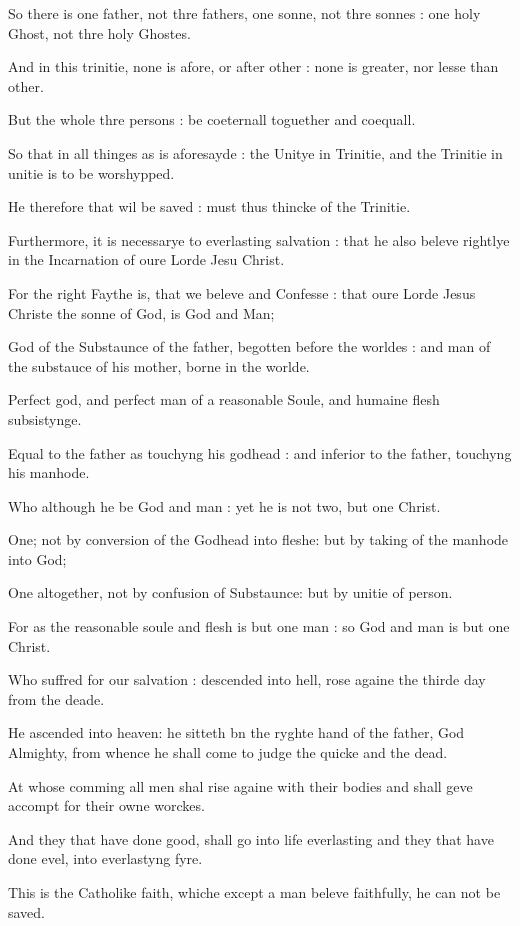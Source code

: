 So there is one father, not thre fathers, one sonne,
not thre sonnes : one holy Ghost, not thre holy Ghostes.

And in this trinitie, none is afore, or after other
: none is greater, nor lesse than other.

But the whole thre persons : be coeternall toguether
and coequall.

So that in all thinges as is aforesayde : the Unitye
in Trinitie, and the Trinitie in unitie is to be worshypped.

He therefore that wil be saved : must thus thincke
of the Trinitie.

Furthermore, it is necessarye to everlasting salvation
: that he also beleve rightlye in the Incarnation of oure Lorde Jesu Christ.

For the right Faythe is, that we beleve and Confesse
: that oure Lorde Jesus Christe the sonne of God, is God and Man;

God of the Substaunce of the father, begotten before
the worldes : and man of the substauce of his mother, borne in the worlde.

Perfect god, and perfect man of a reasonable Soule,
and humaine flesh subsistynge.

Equal to the father as touchyng his godhead : and inferior
to the father, touchyng his manhode.

Who although he be God and man : yet he is not two,
but one Christ.

One; not by conversion of the Godhead into fleshe:
but by taking of the manhode into God;

One altogether, not by confusion of Substaunce: but
by unitie of person.

For as the reasonable soule and flesh is but one man
: so God and man is but one Christ.

Who suffred for our salvation : descended into hell,
rose againe the thirde day from the deade.

He ascended into heaven: he sitteth bn the ryghte hand
of the father, God Almighty, from whence he shall come to judge the quicke
and the dead. 

At whose comming all men shal rise againe with their
bodies and shall geve accompt for their owne worckes.

And they that have done good, shall go into life everlasting
and they that have done evel, into everlastyng fyre.

This is the Catholike faith, whiche except a man beleve
faithfully, he can not be saved.

